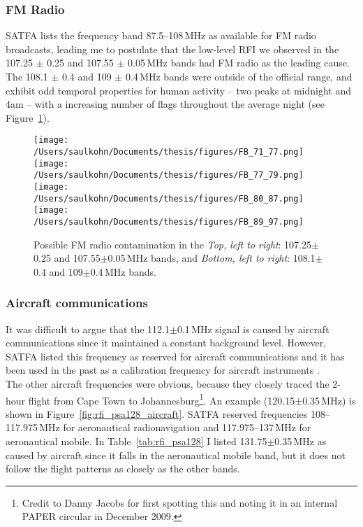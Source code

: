 \subsubsection*{FM Radio}

SATFA lists the frequency band 87.5--108\,MHz as available for FM radio broadcasts, leading me to postulate that the low-level RFI we observed in the 107.25	$\pm$	0.25 and 107.55	$\pm$	0.05\,MHz bands had FM radio as the leading cause. The 108.1	$\pm$	0.4 and 109	$\pm$	0.4\,MHz bands were outside of the official range, and exhibit odd temporal properties for human activity -- two peaks at midnight and 4am -- with a increasing number of flags throughout the average night (see Figure~\ref{fig:rfi_psa128_FMradio}). \\

\begin{figure}[h]
\centering
\texttt{[image: /Users/saulkohn/Documents/thesis/figures/FB\_71\_77.png]}
\texttt{[image: /Users/saulkohn/Documents/thesis/figures/FB\_77\_79.png]}
\texttt{[image: /Users/saulkohn/Documents/thesis/figures/FB\_80\_87.png]}
\texttt{[image: /Users/saulkohn/Documents/thesis/figures/FB\_89\_97.png]}
\caption[Possible FM radio contamination.]{Possible FM radio contamination in the \textit{Top, left to right}: 107.25$\pm$0.25 and 107.55$\pm$0.05\,MHz bands, and \textit{Bottom, left to right}: 108.1$\pm$0.4 and 109$\pm$0.4\,MHz bands.}
\label{fig:rfi_psa128_FMradio}
\end{figure}

\subsubsection*{Aircraft communications}
It was difficult to argue that the 112.1$\pm$0.1\,MHz signal is caused by aircraft communications since it maintained a constant background level. However, SATFA listed this frequency as reserved for aircraft communications and it has been used in the past as a calibration frequency for aircraft instruments \cite{AircraftCalibrationFreqs}.\\

The other aircraft frequencies were obvious, because they closely traced the 2-hour flight from Cape Town to Johannesburg\footnote{Credit to Danny Jacobs for first spotting this and noting it in an internal PAPER circular in December 2009.}. 
An example (120.15$\pm$0.35\,MHz) is shown in Figure~\ref{fig:rfi_psa128_aircraft}. SATFA reserved frequencies 108--117.975\,MHz for aeronautical radionavigation and 117.975--137\,MHz for aeronautical mobile. In Table~\ref{tab:rfi_psa128} I listed 131.75$\pm$0.35\,MHz as caused by aircraft since it falls in the aeronautical mobile band, but it does not follow the flight patterns as closely as the other bands.\\

